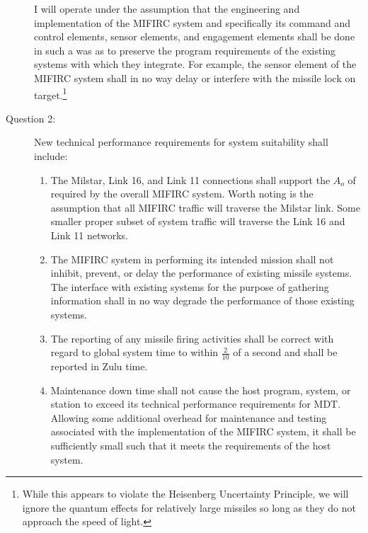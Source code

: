 \documentclass[letterpaper,10pt]{article}
\begin{document}
\begin{description}
I will operate under the assumption that the engineering and implementation of the MIFIRC system and specifically its command and control elements, sensor elements, and engagement elements shall be done in such a was as to preserve the program requirements of the existing systems with which they integrate.  For example, the sensor element of the MIFIRC system shall in no way delay or interfere with the missile lock on target.\footnote{While this appears to violate the Heisenberg Uncertainty Principle, we will ignore the quantum effects for relatively large missiles so long as they do not approach the speed of light.}

\item[Question 2:] New technical performance requirements for system suitability shall include:
	\begin{enumerate}
	\item The Milstar, Link 16, and Link 11 connections shall support the $A_{o}$ of required by the overall MIFIRC system.  Worth noting is the assumption that all MIFIRC traffic will traverse the Milstar link.  Some smaller proper subset of system traffic will traverse the Link 16 and Link 11 networks.
	\item The MIFIRC system in performing its intended mission shall not inhibit, prevent, or delay the performance of existing missile systems.  The interface with existing systems for the purpose of gathering information shall in no way degrade the performance of those existing systems.
	\item The reporting of any missile firing activities shall be correct with regard to global system time to within $\frac{2}{10}$ of a second and shall be reported in Zulu time.
	\item Maintenance down time shall not cause the host program, system, or station to exceed its technical performance requirements for MDT.  Allowing some additional overhead for maintenance and testing associated with the implementation of the MIFIRC system, it shall be sufficiently small such that it meets the requirements of the host system.
	\end{enumerate}


\end{description}
\end{document}
